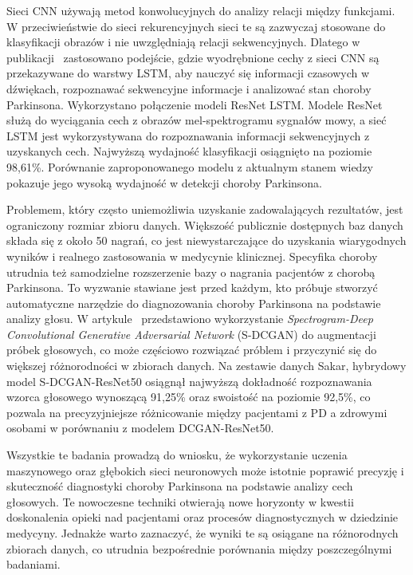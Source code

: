 Sieci CNN używają metod konwolucyjnych do analizy relacji między funkcjami.
W przeciwieństwie do sieci rekurencyjnych sieci te są zazwyczaj stosowane do klasyfikacji obrazów i nie uwzględniają relacji sekwencyjnych.
Dlatego w publikacji~\cite{ER2021103006} zastosowano podejście, gdzie wyodrębnione cechy z sieci CNN są przekazywane do warstwy LSTM, aby nauczyć się
informacji czasowych w dźwiękach, rozpoznawać sekwencyjne informacje i analizować stan choroby Parkinsona.
Wykorzystano połączenie modeli ResNet LSTM\@.
Modele ResNet służą do wyciągania cech z obrazów mel-spektrogramu sygnałów mowy, a
sieć LSTM jest wykorzystywana do rozpoznawania informacji sekwencyjnych z uzyskanych cech.
Najwyższą wydajność klasyfikacji osiągnięto na poziomie 98,61\%.
Porównanie zaproponowanego modelu z aktualnym stanem wiedzy pokazuje jego wysoką wydajność w detekcji choroby Parkinsona.

Problemem, który często uniemożliwia uzyskanie zadowalających rezultatów, jest ograniczony rozmiar zbioru danych.
Większość publicznie dostępnych baz danych składa się z około 50 nagrań, co jest niewystarczające do uzyskania wiarygodnych wyników i
realnego zastosowania w medycynie klinicznej.
Specyfika choroby utrudnia też samodzielne rozszerzenie bazy o nagrania pacjentów z chorobą Parkinsona.
To wyzwanie stawiane jest przed każdym, kto próbuje stworzyć automatyczne narzędzie do diagnozowania choroby Parkinsona na podstawie analizy głosu.
W artykule~\cite{9257451} przedstawiono wykorzystanie \emph{Spectrogram-Deep Convolutional Generative Adversarial Network} (S-DCGAN) do
augmentacji próbek głosowych, co może częściowo rozwiązać próblem i przyczynić się do większej różnorodności w zbiorach danych.
Na zestawie danych Sakar, hybrydowy model S-DCGAN-ResNet50 osiągnął najwyższą dokładność rozpoznawania wzorca głosowego wynoszącą 91,25\%
oraz swoistość na poziomie 92,5\%, co pozwala na precyzyjniejsze różnicowanie między pacjentami z PD a zdrowymi osobami w porównaniu z modelem
DCGAN-ResNet50.

Wszystkie te badania prowadzą do wniosku, że wykorzystanie uczenia maszynowego oraz głębokich sieci neuronowych może istotnie poprawić precyzję
i skuteczność diagnostyki choroby Parkinsona na podstawie analizy cech głosowych.
Te nowoczesne techniki otwierają nowe horyzonty w kwestii doskonalenia opieki nad pacjentami oraz procesów diagnostycznych w dziedzinie medycyny.
Jednakże warto zaznaczyć, że wyniki te są osiągane na różnorodnych zbiorach danych, co utrudnia bezpośrednie porównania między poszczególnymi badaniami.

